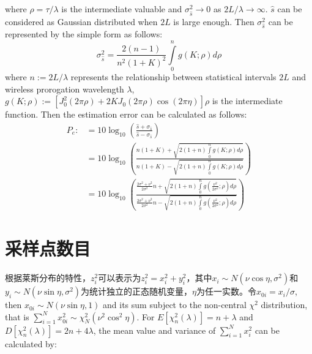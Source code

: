 where $\rho=\tau/\lambda$ is the intermediate valuable and $\sigma_{\hat{s}}^2\rightarrow0$ as $2L/\lambda\rightarrow\infty$. $\hat{s}$ can be considered as Gaussian distributed when $2L$ is large enough. Then $\sigma_{\hat{s}}^2$ can be represented by the simple form as follows:
\begin{equation}
\sigma_{\hat{s}}^2=\frac{2(n-1)}{n^2(1+K)^2}\int\limits_0^n g(K;\rho) d\rho
\label{app:sigmareplace}
\end{equation}
where $n:=2L/\lambda$ represents the relationship between statistical intervals $2L$ and wireless prorogation wavelength $\lambda$, $g(K;\rho):=[J_0^2(2\pi \rho)+2KJ_0(2\pi \rho)\cos(2\pi \eta)]\rho$ is the intermediate function. Then the estimation error can be calculated as follows:
\begin{equation}
\begin{split}
P_e:&=10 \log_{10}\left(\frac{\hat{s}+\sigma_{\hat{s}}}{\hat{s}-\sigma_{\hat{s}}}\right) \\
    &=10 \log_{10}\left(\frac{n(1+K)+\sqrt{2(1+n)\int\limits_0^n g(K;\rho) d\rho}}{n(1+K)-\sqrt{2(1+n)\int\limits_0^n g(K;\rho) d\rho}}\right) \\
    &= 10 \log_{10}\left(\frac{\frac{2\sigma^2+\nu^2}{2\sigma^2}n+\sqrt{2(1+n)\int\limits_0^n g\left(\frac{\nu^2}{2\sigma^2};\rho\right) d\rho}}{\frac{2\sigma^2+\nu^2}{2\sigma^2}n-\sqrt{2(1+n)\int\limits_0^n g\left(\frac{\nu^2}{2\sigma^2};\rho\right) d\rho}}\right)
\end{split}
\label{app:Perror}
\end{equation}


\section{采样点数目}
\label{appsec:numberestimation}

根据莱斯分布的特性，$z_i^2$可以表示为$z_i^2=x_i^2+y_i^2$，其中$x_i \sim N(\nu\cos \eta,\sigma^2)$和$y_i \sim N(\nu\sin \eta,\sigma^2)$为统计独立的正态随机变量，$\eta$为任一实数。令$x_{0i}=x_i/\sigma$, then $x_{0i} \sim N(\nu \sin \eta,1)$ and its sum subject to the non-central $\chi^2$ distribution, that is $\sum_{i=1}^{N}x_{0i}^2 \sim \chi_N^2(\nu^2\cos^2\eta)$. For $E[\chi_n^2(\lambda)]=n+\lambda$ and $D[\chi_n^2(\lambda)]=2n+4\lambda$, the mean value and variance of $\sum_{i=1}^{N}x_i^2$ can be calculated by:

